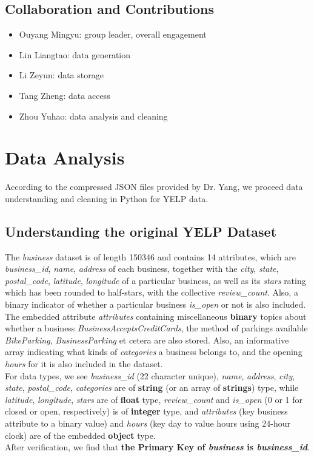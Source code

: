 \documentclass[runningheads]{llncs}
\begin{document}
\subsection{Collaboration and Contributions}

\begin{itemize}
    \item Ouyang Mingyu: group leader, overall engagement
    \item Lin Liangtao: data generation
    \item Li Zeyun: data storage
    \item Tang Zheng: data access
    \item Zhou Yuhao: data analysis and cleaning

\end{itemize}

\clearpage

\section{Data Analysis}

According to the compressed JSON files provided by Dr. Yang, we proceed data understanding and cleaning in Python for YELP data. 

\subsection{Understanding the original YELP Dataset}
The \textit{business} dataset is of length 150346 and contains 14 attributes, which are \textit{business\_id}, \textit{name}, \textit{address} of each business, together with the \textit{city}, \textit{state}, \textit{postal\_code}, \textit{latitude}, \textit{longitude} of a particular business, as well as its \textit{stars} rating which has been rounded to half-stars, with the collective \textit{review\_count}. Also, a binary indicator of whether a particular business \textit{is\_open} or not is also included. The embedded attribute \textit{attributes} containing miscellaneous \textbf{binary} topics about whether a business \textit{BusinessAcceptsCreditCards}, the method of parkings available \textit{BikeParking}, \textit{BusinessParking} et cetera are also stored. Also, an informative array indicating what kinds of \textit{categories} a business belongs to, and the opening \textit{hours} for it is also included in the dataset. \\
For data types, we see \textit{business\_id} (22 character unique), \textit{name}, \textit{address}, \textit{city}, \textit{state}, \textit{postal\_code}, \textit{categories} are of \textbf{string} (or an array of \textbf{strings}) type, while \textit{latitude}, \textit{longitude}, \textit{stars} are of \textbf{float} type, \textit{review\_count} and \textit{is\_open} (0 or 1 for closed or open, respectively) is of \textbf{integer} type, and \textit{attributes} (key business attribute to a binary value) and \textit{hours} (key day to value hours using 24-hour clock) are of the embedded \textbf{object} type. \\
After verification, we find that \textbf{the Primary Key of \textit{business} is \textit{business\_id}}. \\
\end{document}
